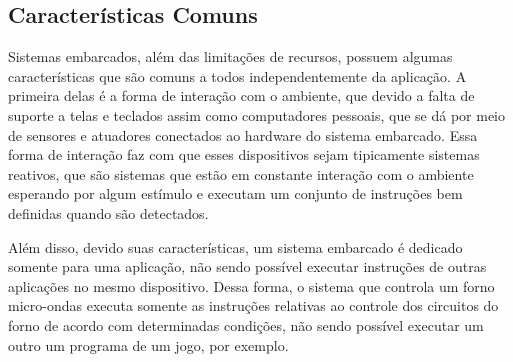 \subsection{Características Comuns}

Sistemas embarcados, além das limitações de recursos, possuem algumas características que são comuns a todos independentemente da aplicação. A primeira delas é a forma de interação com o ambiente, que devido a falta de suporte a telas e teclados assim como computadores pessoais, que se dá por meio de sensores e atuadores conectados ao hardware do sistema embarcado. Essa forma de interação faz com que esses dispositivos sejam tipicamente sistemas reativos, que são sistemas que estão em constante interação com o ambiente esperando por algum estímulo e executam um conjunto de instruções bem definidas quando são detectados.

Além disso, devido suas características, um sistema embarcado é dedicado somente para uma aplicação, não sendo possível executar instruções de outras aplicações no mesmo dispositivo. Dessa forma, o sistema que controla um forno micro-ondas executa somente as instruções relativas ao controle dos circuitos do forno de acordo com determinadas condições, não sendo possível executar um outro um programa de um jogo, por exemplo. 

















